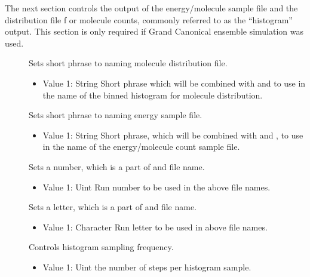 \documentclass[letterpaper,10pt,english]{sphinxmanual}
\begin{document}
The next section controls the output of the energy/molecule sample file and the distribution file f
or molecule counts, commonly referred to as the “histogram” output. This section is only required
if Grand Canonical ensemble simulation was used.
\begin{description}
\item[{}] \leavevmode
Sets short phrase to naming molecule distribution file.
\begin{itemize}
\item {} 
Value 1: String \sphinxhyphen{} Short phrase which will be combined with  and  to use in the name of the binned histogram for molecule distribution.

\end{itemize}

\item[{}] \leavevmode
Sets short phrase to naming energy sample file.
\begin{itemize}
\item {} 
Value 1: String \sphinxhyphen{} Short phrase, which will be combined with  and , to use in the name of the energy/molecule count sample file.

\end{itemize}

\item[{}] \leavevmode
Sets a number, which is a part of  and  file name.
\begin{itemize}
\item {} 
Value 1: Uint \textendash{} Run number to be used in the above file names.

\end{itemize}

\item[{}] \leavevmode
Sets a letter, which is a part of  and  file name.
\begin{itemize}
\item {} 
Value 1: Character \textendash{} Run letter to be used in above file names.

\end{itemize}

\item[{}] \leavevmode
Controls histogram sampling frequency.
\begin{itemize}
\item {} 
Value 1: Uint \textendash{} the number of steps per histogram sample.


\end{itemize}
\end{description}
\end{document}
